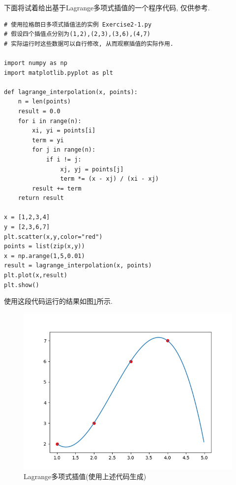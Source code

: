 下面将试着给出基于Lagrange多项式插值的一个程序代码, 仅供参考.

\begin{lstlisting}
# 使用拉格朗日多项式插值法的实例 Exercise2-1.py
# 假设四个插值点分别为(1,2),(2,3),(3,6),(4,7)
# 实际运行时这些数据可以自行修改, 从而观察插值的实际作用.

import numpy as np
import matplotlib.pyplot as plt

def lagrange_interpolation(x, points):
    n = len(points)
    result = 0.0
    for i in range(n):
        xi, yi = points[i]
        term = yi
        for j in range(n):
            if i != j:
                xj, yj = points[j]
                term *= (x - xj) / (xi - xj)
        result += term
    return result

x = [1,2,3,4]
y = [2,3,6,7]
plt.scatter(x,y,color="red")
points = list(zip(x,y))
x = np.arange(1,5,0.01)
result = lagrange_interpolation(x, points)
plt.plot(x,result)
plt.show()
\end{lstlisting}

使用这段代码运行的结果如图\ref{fig:Lagrange多项式插值}所示.

\begin{figure}[h]
    \centering
    \includegraphics[width=1\linewidth]{Chapter2/graph/python/Figure2-1.png}
    \caption{Lagrange多项式插值(使用上述代码生成)}
    \label{fig:Lagrange多项式插值}
\end{figure}